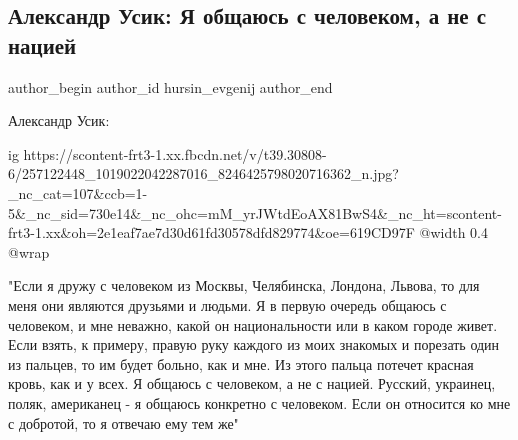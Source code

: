  
 
 
 
 
 
\subsection{Александр Усик: Я общаюсь с человеком, а не с нацией}
\label{sec:14_11_2021.fb.hursin_evgenij.1.usik_chelovek}
 
\ifcmt
 author_begin
   author_id hursin_evgenij
 author_end
\fi

Александр Усик: 

\ifcmt
  ig https://scontent-frt3-1.xx.fbcdn.net/v/t39.30808-6/257122448_1019022042287016_8246425798020716362_n.jpg?_nc_cat=107&ccb=1-5&_nc_sid=730e14&_nc_ohc=mM_yrJWtdEoAX81BwS4&_nc_ht=scontent-frt3-1.xx&oh=2e1eaf7ae7d30d61fd30578dfd829774&oe=619CD97F
  @width 0.4
  @wrap 
\fi

\obeycr
"Если я дружу с человеком из Москвы, Челябинска, Лондона, Львова, то для меня
они являются друзьями и людьми.  Я в первую очередь общаюсь с человеком, и мне
неважно, какой он национальности или в каком городе живет.
Если взять, к примеру, правую руку каждого из моих знакомых и порезать один из пальцев, то им будет больно, как и мне. 
Из этого пальца потечет красная кровь, как и у всех. 
Я общаюсь с человеком, а не с нацией. 
Русский, украинец, поляк, американец - я общаюсь конкретно с человеком. 
Если он относится ко мне с добротой, то я отвечаю ему тем же"
\restorecr
